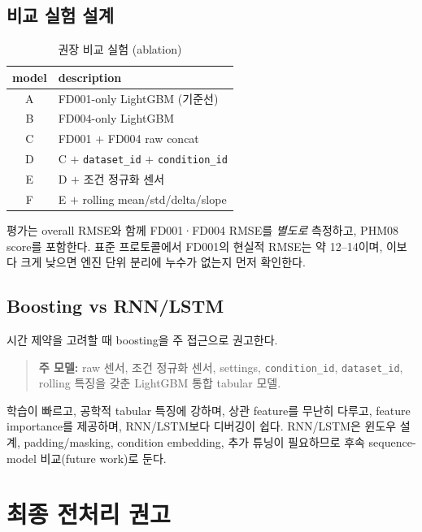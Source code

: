 \documentclass[11pt]{article}
\begin{document}
\subsection{비교 실험 설계}

\begin{table}[H]
\centering
\caption{권장 비교 실험 (ablation)}
\label{tab:experiments}
\begin{tabular}{cp{10.5cm}}
\toprule
model & description \\
\midrule
A & FD001-only LightGBM (기준선) \\
B & FD004-only LightGBM \\
C & FD001 $+$ FD004 raw concat \\
D & C $+$ \texttt{dataset\_id} $+$ \texttt{condition\_id} \\
E & D $+$ 조건 정규화 센서 \\
F & E $+$ rolling mean/std/delta/slope \\
\bottomrule
\end{tabular}
\end{table}

평가는 overall RMSE와 함께 FD001·FD004 RMSE를 \emph{별도로} 측정하고, PHM08 score를 포함한다.
표준 프로토콜에서 FD001의 현실적 RMSE는 약 12--14이며, 이보다 크게 낮으면 엔진 단위 분리에 누수가 없는지 먼저 확인한다.

\subsection{Boosting vs RNN/LSTM}

시간 제약을 고려할 때 boosting을 주 접근으로 권고한다.

\begin{quote}
\textbf{주 모델:} raw 센서, 조건 정규화 센서, settings, \texttt{condition\_id}, \texttt{dataset\_id}, rolling 특징을 갖춘 LightGBM 통합 tabular 모델.
\end{quote}

학습이 빠르고, 공학적 tabular 특징에 강하며, 상관 feature를 무난히 다루고, feature importance를 제공하며, RNN/LSTM보다 디버깅이 쉽다.
RNN/LSTM은 윈도우 설계, padding/masking, condition embedding, 추가 튜닝이 필요하므로 후속 sequence-model 비교(future work)로 둔다.

\section{최종 전처리 권고}
\end{document}
